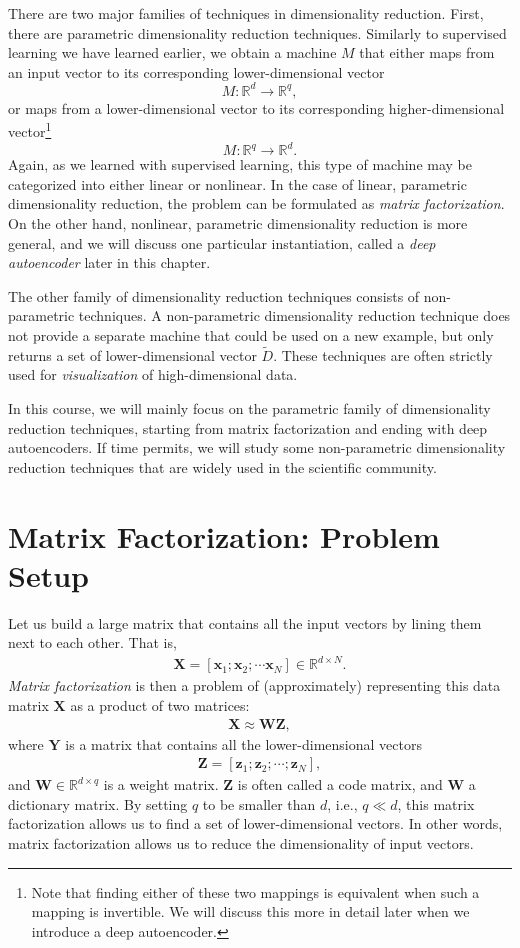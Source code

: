 \documentclass{report}
\newcommand{\vect}[1]{\mathbf{#1}}
\newcommand{\matr}[1]{\mathbf{#1}}
\newcommand{\vx}[0]{\vect{x}}
\newcommand{\vz}[0]{\vect{z}}
\newcommand{\mW}[0]{\matr{W}}
\newcommand{\mZ}[0]{\matr{Z}}
\newcommand{\mX}[0]{\matr{X}}
\newcommand{\mY}[0]{\matr{Y}}
\newcommand{\RR}[0]{\mathbb{R}}
\begin{document}
There are two major families of techniques in dimensionality reduction. First,
there are parametric dimensionality reduction techniques. Similarly to
supervised learning we have learned earlier, we obtain a machine $M$ that either
maps from an input vector to its corresponding lower-dimensional vector 
\[
    M: \RR^d \to \RR^q,
\]
or maps
from a lower-dimensional vector to its corresponding higher-dimensional
vector\footnote{
    Note that finding either of these two mappings is equivalent when such a
    mapping is invertible. We will discuss this more in detail later when we
    introduce a deep autoencoder. 
}
\[
    M: \RR^q \to \RR^d.
\]
Again, as we learned with supervised learning, this type of machine may be
categorized into either linear or nonlinear. In the case of linear, parametric
dimensionality reduction, the problem can be formulated as {\it matrix
factorization}. On the other hand, nonlinear, parametric dimensionality
reduction is more general, and we will discuss one particular instantiation,
called a {\it deep autoencoder} later in this chapter.

The other family of dimensionality reduction techniques consists of
non-parametric techniques. A non-parametric dimensionality reduction technique
does not provide a separate machine that could be used on a new example, but
only returns a set of lower-dimensional vector $\tilde{D}$. These techniques are
often strictly used for {\it visualization} of high-dimensional data. 

In this course, we will mainly focus on the parametric family of dimensionality
reduction techniques, starting from matrix factorization and ending with deep
autoencoders. If time permits, we will study some non-parametric dimensionality
reduction techniques that are widely used in the scientific community.


\section{Matrix Factorization: Problem Setup}

Let us build a large matrix that contains all the input vectors by lining them
next to each other. That is,
\begin{align*}
    \mX = \left[ \vx_1; \vx_2; \cdots \vx_N \right] \in \RR^{d \times N}.
\end{align*}
{\it Matrix factorization} is then a problem of (approximately) representing
this data matrix $\mX$ as a product of two matrices:
\begin{align}
    \label{eq:matfac}
    \mX \approx \mW \mZ,
\end{align}
where $\mY$ is a matrix that contains all the lower-dimensional vectors
\begin{align*}
    \mZ =\left[ \vz_1; \vz_2; \cdots; \vz_N \right],
\end{align*}
and $\mW \in \RR^{d \times q}$ is a weight matrix. $\mZ$ is often called a code
matrix, and $\mW$ a dictionary matrix.  By setting $q$ to be smaller than $d$,
i.e., $q \ll d$, this matrix factorization allows us to find a set of
lower-dimensional vectors. In other words, matrix factorization allows us to
reduce the dimensionality of input vectors.
\end{document}

